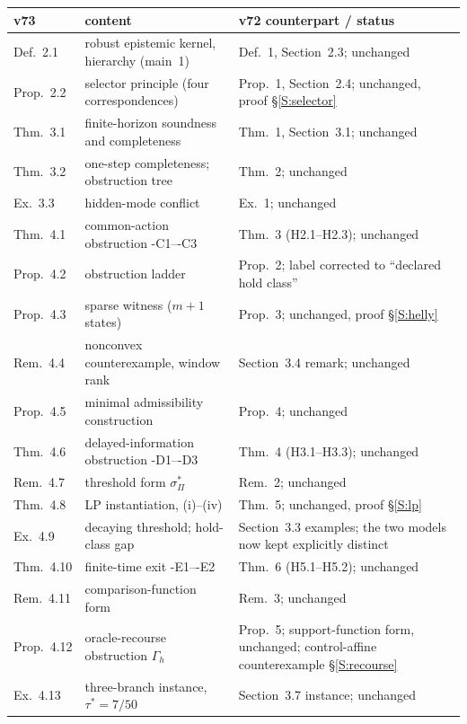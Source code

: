 \begin{table}[htbp]
\centering\small
\begin{tabularx}{\textwidth}{@{}l>{\raggedright\arraybackslash}X>{\raggedright\arraybackslash}X@{}}
\toprule
v73 & content & v72 counterpart / status\\
\midrule
Def.~2.1 & robust epistemic kernel, hierarchy (main~1) & Def.~1, Section~2.3; unchanged\\
Prop.~2.2 & selector principle (four correspondences) & Prop.~1, Section~2.4; unchanged, proof \S\ref{S:selector}\\
Thm.~3.1 & finite-horizon soundness and completeness & Thm.~1, Section~3.1; unchanged\\
Thm.~3.2 & one-step completeness; obstruction tree & Thm.~2; unchanged\\
Ex.~3.3 & hidden-mode conflict & Ex.~1; unchanged\\
Thm.~4.1 & common-action obstruction \hyp{C1}--\hyp{C3} & Thm.~3 (H2.1--H2.3); unchanged\\
Prop.~4.2 & obstruction ladder & Prop.~2; label corrected to ``declared hold class''\\
Prop.~4.3 & sparse witness ($m{+}1$ states) & Prop.~3; unchanged, proof \S\ref{S:helly}\\
Rem.~4.4 & nonconvex counterexample, window rank & Section~3.4 remark; unchanged\\
Prop.~4.5 & minimal admissibility construction & Prop.~4; unchanged\\
Thm.~4.6 & delayed-information obstruction \hyp{D1}--\hyp{D3} & Thm.~4 (H3.1--H3.3); unchanged\\
Rem.~4.7 & threshold form $\sigma^*_\Pi$ & Rem.~2; unchanged\\
Thm.~4.8 & LP instantiation, (i)--(iv) & Thm.~5; unchanged, proof \S\ref{S:lp}\\
Ex.~4.9 & decaying threshold; hold-class gap & Section~3.3 examples; the two models now kept explicitly distinct\\
Thm.~4.10 & finite-time exit \hyp{E1}--\hyp{E2} & Thm.~6 (H5.1--H5.2); unchanged\\
Rem.~4.11 & comparison-function form & Rem.~3; unchanged\\
Prop.~4.12 & oracle-recourse obstruction $\Gamma_h$ & Prop.~5; support-function form, unchanged; control-affine counterexample \S\ref{S:recourse}\\
Ex.~4.13 & three-branch instance, $\tau^*=7/50$ & Section~3.7 instance; unchanged\\

\end{tabularx}
\end{table}
